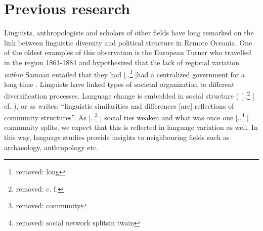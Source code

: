 \documentclass[unnumsec,webpdf,modern,medium]{oup-authoring-template}
\providecommand{\DIFaddtex}[1]{{\protect\color{blue} \sf #1}} %
\providecommand{\DIFdeltex}[1]{{\protect\color{red} [..\footnote{removed: #1} ]}} %
\providecommand{\DIFaddbegin}{} %
\providecommand{\DIFaddend}{} %
\providecommand{\DIFdelbegin}{} %
\providecommand{\DIFdelend}{} %
\providecommand{\DIFadd}[1]{\texorpdfstring{\DIFaddtex{#1}}{#1}} %
\providecommand{\DIFdel}[1]{\texorpdfstring{\DIFdeltex{#1}}{}} %
\newcommand{\DIFscaledelfig}{0.5}
\newlength{\DIFdelgraphicswidth} %
\newlength{\DIFdelgraphicsheight} %
\newcommand{\DIFaddincludegraphics}[2][]{{\color{blue}\fbox{\DIFOincludegraphics[#1]{#2}}}} %
\newcommand{\DIFdelincludegraphics}[2][]{%
\sbox{\DIFdelgraphicsbox}{\DIFOincludegraphics[#1]{#2}}%
\settoboxwidth{\DIFdelgraphicswidth}{\DIFdelgraphicsbox} %
\settoboxtotalheight{\DIFdelgraphicsheight}{\DIFdelgraphicsbox} %
\scalebox{\DIFscaledelfig}{%
\parbox[b]{\DIFdelgraphicswidth}{\usebox{\DIFdelgraphicsbox}\\[-\baselineskip] \rule{\DIFdelgraphicswidth}{0em}}\llap{\resizebox{\DIFdelgraphicswidth}{\DIFdelgraphicsheight}{%
\setlength{\unitlength}{\DIFdelgraphicswidth}%
\begin{picture}(1,1)%
\thicklines\linethickness{2pt} %
{\color[rgb]{1,0,0}\put(0,0){\framebox(1,1){}}}%
{\color[rgb]{1,0,0}\put(0,0){\line( 1,1){1}}}%
{\color[rgb]{1,0,0}\put(0,1){\line(1,-1){1}}}%
\end{picture}%
}\hspace*{3pt}}} %
} %
\DeclareRobustCommand{\DIFaddbegin}{\DIFOaddbegin \let\includegraphics\DIFaddincludegraphics} %
\DeclareRobustCommand{\DIFaddend}{\DIFOaddend \let\includegraphics\DIFOincludegraphics} %
\DeclareRobustCommand{\DIFdelbegin}{\DIFOdelbegin \let\includegraphics\DIFdelincludegraphics} %
\DeclareRobustCommand{\DIFdelend}{\DIFOaddend \let\includegraphics\DIFOincludegraphics} %
\begin{document}


\FloatBarrier
\section{Previous research}
\label{sec:previous_research}
Linguists, anthropologists and scholars of other fields have long remarked on the link between linguistic diversity and political structure in Remote Oceania. One of the oldest examples of this observation is the European Turner who travelled in the region 1861-1884 and hypothesized that the lack of regional variation \emph{within} S\={a}moan entailed that they had \DIFdelbegin \DIFdel{long }\DIFdelend had a centralized government \DIFaddbegin \DIFadd{for a long time }\DIFaddend \citep[172]{turner1884}. Linguists have linked types of societal organization to different diversification processes. Language change is embedded in social structure (\DIFdelbegin \DIFdel{c. f. }\DIFdelend \DIFaddbegin \DIFadd{cf. }\DIFaddend \citep{WLH1968}), or as \citet[124]{grace_1992_aberrant} writes: ``linguistic similarities and differences [are] reflections of community structures''. As \DIFdelbegin \DIFdel{community }\DIFdelend \DIFaddbegin \DIFadd{social }\DIFaddend ties weaken and what was once one \DIFdelbegin \DIFdel{social network splitsin twain}\DIFdelend \DIFaddbegin \DIFadd{community splits}\DIFaddend , we expect that this is reflected in language variation as well. In this way, language studies provide insights to neighbouring fields such as archaeology, anthropology etc.
\end{document}
